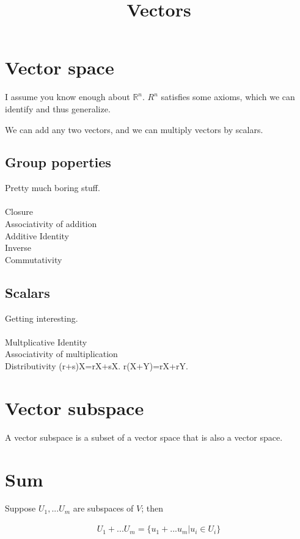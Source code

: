 \documentclass{article}
\title{Vectors}
\date{}
\begin{document}
\maketitle

\section{Vector space}

I assume you know enough about $\mathbb{R}^n$. $R^n$ satisfies some axioms, which we can identify and thus generalize.

We can add any two vectors, and we can multiply vectors by scalars.

\subsection*{Group poperties}

Pretty much boring stuff.\\\\
Closure\\
Associativity of addition\\
Additive Identity\\
Inverse\\
Commutativity

\subsection*{Scalars}

Getting interesting.\\\\
Multplicative Identity\\
Associativity of multiplication\\
Distributivity 
(r+s)X=rX+sX. 	
r(X+Y)=rX+rY. 	

\section{Vector subspace}

A vector subspace is a subset of a vector space that is also a vector space.

\section{Sum}

Suppose $U_1, ... U_m$ are subspaces of $V$; then 

\begin{align}
U_1 + ... U_m = \{u_1 + ... u_m | u_i \in U_i\}
\end{align}
\end{document}
